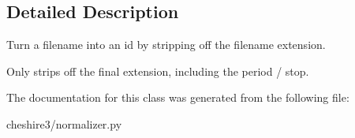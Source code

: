 \subsection{Detailed Description}
\begin{DoxyVerb}Turn a filename into an id by stripping off the filename extension.

Only strips off the final extension, including the period / stop.
\end{DoxyVerb}
 

The documentation for this class was generated from the following file\-:\begin{DoxyCompactItemize}
\item 
cheshire3/normalizer.\-py\end{DoxyCompactItemize}

